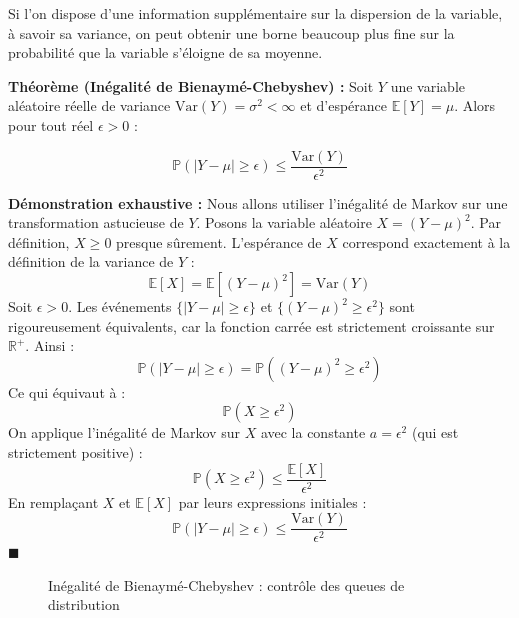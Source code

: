 \documentclass[11pt,a4paper]{article}
\begin{document}
Si l'on dispose d'une information supplémentaire sur la dispersion de la variable, à savoir sa variance, on peut obtenir une borne beaucoup plus fine sur la probabilité que la variable s'éloigne de sa moyenne.

\textbf{Théorème (Inégalité de Bienaymé-Chebyshev) :}
Soit $Y$ une variable aléatoire réelle de variance $\text{Var}(Y) = \sigma^2 < \infty$ et d'espérance $\mathbb{E}[Y] = \mu$. Alors pour tout réel $\epsilon > 0$ :

$$ \mathbb{P}(|Y - \mu| \ge \epsilon) \le \frac{\text{Var}(Y)}{\epsilon^2} $$

\textbf{Démonstration exhaustive :}
Nous allons utiliser l'inégalité de Markov sur une transformation astucieuse de $Y$.
Posons la variable aléatoire $X = (Y - \mu)^2$.
Par définition, $X \ge 0$ presque sûrement.
L'espérance de $X$ correspond exactement à la définition de la variance de $Y$ :
$$ \mathbb{E}[X] = \mathbb{E}[(Y - \mu)^2] = \text{Var}(Y) $$
Soit $\epsilon > 0$. Les événements $\{|Y - \mu| \ge \epsilon\}$ et $\{(Y - \mu)^2 \ge \epsilon^2\}$ sont rigoureusement équivalents, car la fonction carrée est strictement croissante sur $\mathbb{R}^+$.
Ainsi :
$$ \mathbb{P}(|Y - \mu| \ge \epsilon) = \mathbb{P}((Y - \mu)^2 \ge \epsilon^2) $$
Ce qui équivaut à :
$$ \mathbb{P}(X \ge \epsilon^2) $$
On applique l'inégalité de Markov sur $X$ avec la constante $a = \epsilon^2$ (qui est strictement positive) :
$$ \mathbb{P}(X \ge \epsilon^2) \le \frac{\mathbb{E}[X]}{\epsilon^2} $$
En remplaçant $X$ et $\mathbb{E}[X]$ par leurs expressions initiales :
$$ \mathbb{P}(|Y - \mu| \ge \epsilon) \le \frac{\text{Var}(Y)}{\epsilon^2} $$
$\blacksquare$

\begin{figure}[h]
\centering
{}
\caption{Inégalité de Bienaymé-Chebyshev : contrôle des queues de distribution}
\end{figure}
\end{document}
